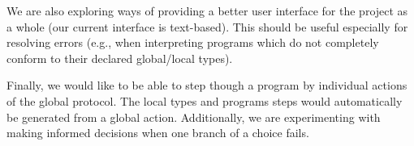 \documentclass[runningheads]{llncs}
\begin{document}
We are also exploring ways of providing a better user interface for
the project as a whole (our current interface is text-based). This
should be useful especially for resolving errors (e.g., when
interpreting programs which do not completely conform to their
declared global/local types).

Finally, we would like to be able to step though a program by
individual actions of the global protocol. The local types and
programs steps would automatically be generated from a global action.
Additionally, we are experimenting with making informed decisions when
one branch of a choice fails.
%
%
%
% 
 
 
%
\end{document}
